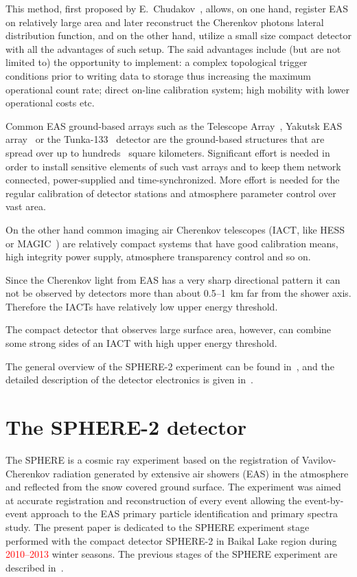 \documentclass[final,5p,times,twocolumn]{elsarticle}
\begin{document}
This method, first proposed by E.~Chudakov~\cite{chu74}, allows, on one hand, register EAS on relatively large area and later reconstruct the Cherenkov photons lateral distribution function, and on the other hand, utilize a small size compact detector with all the advantages of such setup. The said advantages include (but are not limited to) the opportunity to implement: a complex topological trigger conditions prior to writing data to storage thus increasing the maximum operational count rate; direct on-line calibration system; high mobility with lower operational costs etc.

Common EAS ground-based arrays such as the Telescope Array~\cite{abu12}, Yakutsk EAS array~\cite{} or the Tunka-133~\cite{} detector are the ground-based structures that are spread over up to hundreds~\cite{abu12} square kilometers. Significant effort is needed in order to install sensitive elements of such vast arrays and to keep them network connected, power-supplied and time-synchronized. More effort is needed for the regular calibration of detector stations and atmosphere parameter control over vast area. 

On the other hand common imaging air Cherenkov telescopes (IACT, like HESS~\cite{} or MAGIC~\cite{}) are relatively compact systems that have good calibration means, high integrity power supply, atmosphere transparency control and so on.

Since the Cherenkov light from EAS has a very sharp directional pattern it can not be observed by detectors more than about 0.5--1~km far from the shower axis. Therefore the IACTs have relatively low upper energy threshold.

The compact detector that observes large surface area, however, can combine some strong sides of an IACT with high upper energy threshold. 

The general overview of the SPHERE-2 experiment can be found in~\cite{Ant15a}, and the detailed description of the detector electronics is given in~\cite{Ant20}.


\section{The SPHERE-2 detector \label{sect:detector}}
The SPHERE is a cosmic ray experiment based on the registration of Vavilov-Cherenkov radiation generated by extensive air showers (EAS) in the atmosphere and reflected from the snow covered ground surface. The experiment was aimed at accurate registration and reconstruction of every event allowing the event-by-event approach to the EAS primary particle identification and primary spectra study. The present paper is dedicated to the SPHERE experiment stage performed with the compact detector SPHERE-2 in Baikal Lake region during \textcolor{red}{2010--2013} winter seasons. The previous stages of the SPHERE experiment are described in~\cite{Ant15a}. %
\end{document}
